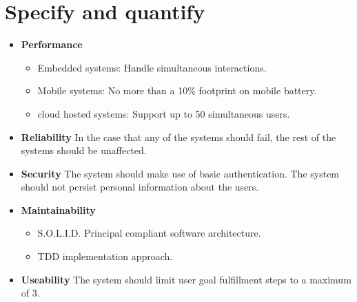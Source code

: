\section{Specify and quantify}
\begin{itemize}
\item \textbf{Performance}
    \begin{itemize}
        \item Embedded systems: Handle simultaneous interactions.
        \item Mobile systems: No more than a 10\% footprint on mobile battery.
        \item cloud hosted systems: Support up to 50 simultaneous users.
    \end{itemize}
\item \textbf{Reliability}
    \newline
    In the case that any of the systems should fail, the rest of the systems should be unaffected.
    \newline
\item \textbf{Security}
    \newline
    The system should make use of basic authentication.
    The system should not persist personal information about the users.
    \newline
\item \textbf{Maintainability}
    \begin{itemize}
        \item S.O.L.I.D. Principal compliant software architecture.
        \item TDD implementation approach.
    \end{itemize}
\item \textbf{Useability}
    \newline
    The system should limit user goal fulfillment steps to a maximum of 3.
    \newline
\end{itemize}

